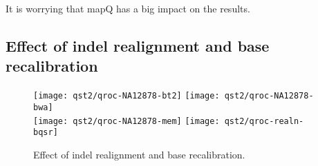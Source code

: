 \documentclass{bioinfo}
\begin{document}
It is worrying that mapQ has a big impact on the results.

\subsection{Effect of indel realignment and base recalibration}

\begin{figure*}[!hp]
\centering\texttt{[image: qst2/qroc-NA12878-bt2]}
\centering\texttt{[image: qst2/qroc-NA12878-bwa]}\\
\centering\texttt{[image: qst2/qroc-NA12878-mem]}
\centering\texttt{[image: qst2/qroc-realn-bqsr]}
\caption{Effect of indel realignment and base recalibration.}\label{fig:qroc2} \end{figure*}

\end{document}
